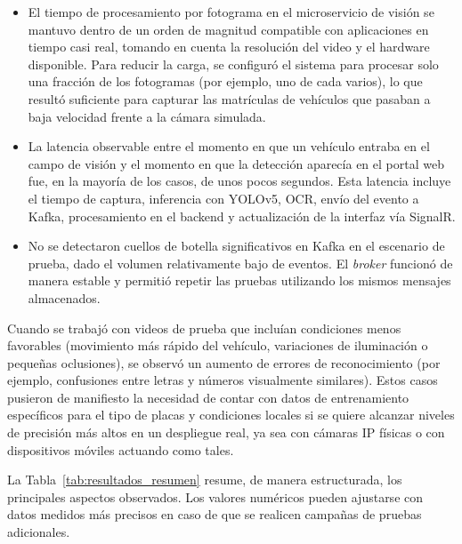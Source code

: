 \begin{itemize}
    \item El tiempo de procesamiento por fotograma en el microservicio de visión se mantuvo dentro de un orden de magnitud compatible con aplicaciones en tiempo casi real, tomando en cuenta la resolución del video y el hardware disponible. Para reducir la carga, se configuró el sistema para procesar solo una fracción de los fotogramas (por ejemplo, uno de cada varios), lo que resultó suficiente para capturar las matrículas de vehículos que pasaban a baja velocidad frente a la cámara simulada.
    \item La latencia observable entre el momento en que un vehículo entraba en el campo de visión y el momento en que la detección aparecía en el portal web fue, en la mayoría de los casos, de unos pocos segundos. Esta latencia incluye el tiempo de captura, inferencia con YOLOv5, OCR, envío del evento a Kafka, procesamiento en el backend y actualización de la interfaz vía SignalR.
    \item No se detectaron cuellos de botella significativos en Kafka en el escenario de prueba, dado el volumen relativamente bajo de eventos. El \textit{broker} funcionó de manera estable y permitió repetir las pruebas utilizando los mismos mensajes almacenados.
\end{itemize}

Cuando se trabajó con videos de prueba que incluían condiciones menos favorables (movimiento más rápido del vehículo, variaciones de iluminación o pequeñas oclusiones), se observó un aumento de errores de reconocimiento (por ejemplo, confusiones entre letras y números visualmente similares). Estos casos pusieron de manifiesto la necesidad de contar con datos de entrenamiento específicos para el tipo de placas y condiciones locales si se quiere alcanzar niveles de precisión más altos en un despliegue real, ya sea con cámaras IP físicas o con dispositivos móviles actuando como tales.

La Tabla~\ref{tab:resultados_resumen} resume, de manera estructurada, los principales aspectos observados. Los valores numéricos pueden ajustarse con datos medidos más precisos en caso de que se realicen campañas de pruebas adicionales.

